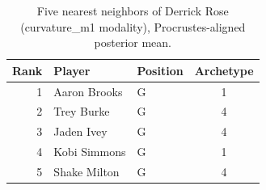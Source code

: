 \begin{table}[htbp]
  \centering\small
  \begin{tabular}{rllc}
    \toprule
    Rank & Player & Position & Archetype \\
    \midrule
    1 & Aaron Brooks & G & 1 \\
    2 & Trey Burke & G & 4 \\
    3 & Jaden Ivey & G & 4 \\
    4 & Kobi Simmons & G & 1 \\
    5 & Shake Milton & G & 4 \\
    \bottomrule
  \end{tabular}
  \caption{Five nearest neighbors of Derrick Rose (curvature_m1 modality), Procrustes-aligned posterior mean.}
  \label{tab:Derrick_Rose_neighbors_curvature_m1}
\end{table}

